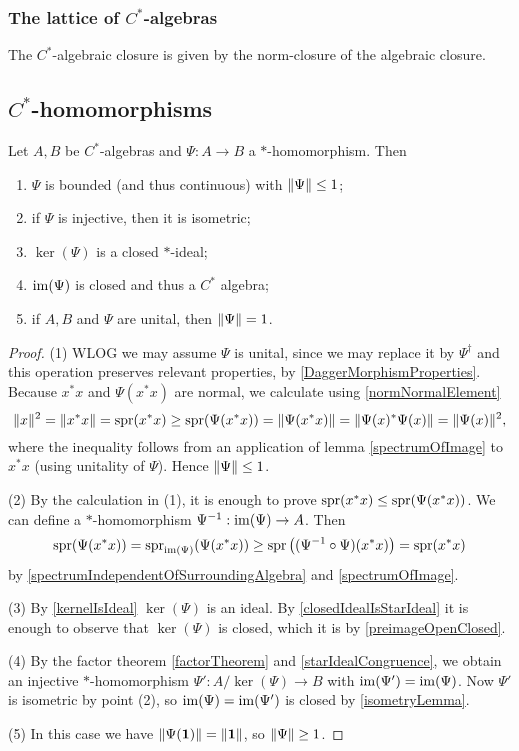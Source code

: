 \subsubsection{The lattice of $C^*$-algebras}
\begin{lemma}
The $C^*$-algebraic closure is given by the norm-closure of the algebraic closure.
\end{lemma}

\subsection{$C^*$-homomorphisms}

\begin{proposition} \label{starHomomorphismCstarProperties}
Let $A,B$ be $C^*$-algebras and $\Psi: A\to B$ a $*$-homomorphism. Then
\begin{enumerate}
\item $\Psi$ is bounded (and thus continuous) with $\lVert\Psi\rVert \leq 1$;
\item if $\Psi$ is injective, then it is isometric;
\item $\ker(\Psi)$ is a closed $*$-ideal;
\item $\operatorname{im}(\Psi)$ is closed and thus a $C^*$ algebra;
\item if $A,B$ and $\Psi$ are unital, then $\lVert\Psi\rVert = 1$.
\end{enumerate}
\end{proposition}
\begin{proof}
(1) WLOG we may assume $\Psi$ is unital, since we may replace it by $\Psi^\dagger$ and this operation preserves relevant properties, by \ref{DaggerMorphismProperties}. Because $x^*x$ and $\Psi(x^*x)$ are normal, we calculate using \ref{normNormalElement}
\[ \lVert x\rVert^2 = \lVert x^*x\rVert = \operatorname{spr}(x^*x) \geq \operatorname{spr}(\Psi(x^*x)) = \lVert\Psi(x^*x)\rVert = \lVert\Psi(x)^*\Psi(x)\rVert = \lVert\Psi(x)\rVert^2, \]
where the inequality follows from an application of lemma \ref{spectrumOfImage} to $x^*x$ (using unitality of $\Psi$). Hence $\lVert\Psi\rVert\leq 1$.

(2) By the calculation in (1), it is enough to prove $\operatorname{spr}(x^*x) \leq \operatorname{spr}(\Psi(x^*x))$. We can define a $*$-homomorphism $\Psi^{-1}: \operatorname{im}(\Psi)\to A$. Then
\[ \operatorname{spr}(\Psi(x^*x)) = \operatorname{spr}_{\operatorname{im}(\Psi)}(\Psi(x^*x)) \geq \operatorname{spr}\big((\Psi^{-1}\circ\Psi)(x^*x)\big) = \operatorname{spr}(x^*x) \]
by \ref{spectrumIndependentOfSurroundingAlgebra} and \ref{spectrumOfImage}.

(3) By \ref{kernelIsIdeal} $\ker(\Psi)$ is an ideal. By \ref{closedIdealIsStarIdeal} it is enough to observe that $\ker(\Psi)$ is closed, which it is by \ref{preimageOpenClosed}.

(4) By the factor theorem \ref{factorTheorem} and \ref{starIdealCongruence}, we obtain an injective $*$-homomorphism $\Psi': A/\ker(\Psi) \to B$ with $\operatorname{im}(\Psi') = \operatorname{im}(\Psi)$. Now $\Psi'$ is isometric by point (2), so $\operatorname{im}(\Psi) = \operatorname{im}(\Psi')$ is closed by \ref{isometryLemma}.

(5) In this case we have $\lVert\Psi(\boldsymbol{\mathrm{1}})\rVert = \lVert\boldsymbol{\mathrm{1}}\rVert$, so $\lVert\Psi\rVert \geq 1$.
\end{proof}


